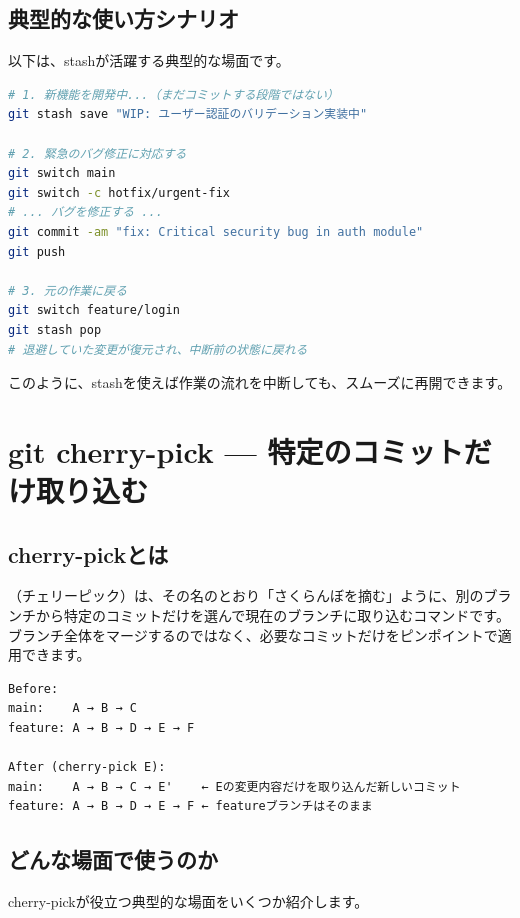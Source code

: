 \subsection{典型的な使い方シナリオ}

以下は、stashが活躍する典型的な場面です。

\begin{lstlisting}[language=bash]
# 1. 新機能を開発中...（まだコミットする段階ではない）
git stash save "WIP: ユーザー認証のバリデーション実装中"

# 2. 緊急のバグ修正に対応する
git switch main
git switch -c hotfix/urgent-fix
# ... バグを修正する ...
git commit -am "fix: Critical security bug in auth module"
git push

# 3. 元の作業に戻る
git switch feature/login
git stash pop
# 退避していた変更が復元され、中断前の状態に戻れる
\end{lstlisting}

このように、stashを使えば作業の流れを中断しても、スムーズに再開できます。

\section{git cherry-pick — 特定のコミットだけ取り込む}

\subsection{cherry-pickとは}

（チェリーピック）は、その名のとおり「さくらんぼを摘む」ように、別のブランチから特定のコミットだけを選んで現在のブランチに取り込むコマンドです。ブランチ全体をマージするのではなく、必要なコミットだけをピンポイントで適用できます。

\begin{lstlisting}[language={}]
Before:
main:    A → B → C
feature: A → B → D → E → F

After (cherry-pick E):
main:    A → B → C → E'    ← Eの変更内容だけを取り込んだ新しいコミット
feature: A → B → D → E → F ← featureブランチはそのまま
\end{lstlisting}

\subsection{どんな場面で使うのか}

cherry-pickが役立つ典型的な場面をいくつか紹介します。

